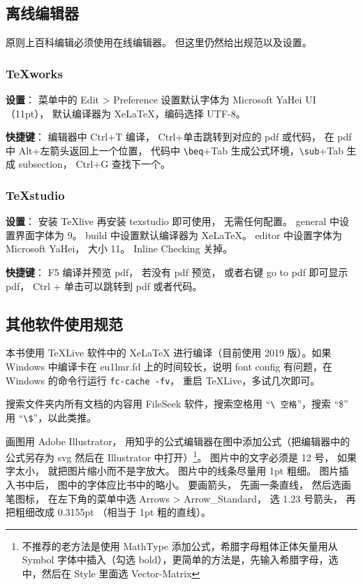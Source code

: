 
\subsection{离线编辑器}

原则上百科编辑必须使用在线编辑器。 但这里仍然给出规范以及设置。

\subsubsection{TeXworks}

\textbf{设置}： 菜单中的 Edit > Preference 设置默认字体为 Microsoft YaHei UI（11pt）， 默认编译器为 XeLaTeX，编码选择 UTF-8。

\textbf{快捷键}：
编辑器中 Ctrl+T 编译， 
Ctrl+单击跳转到对应的 pdf 或代码， 
在 pdf 中 Alt+左箭头返回上一个位置， 
代码中 \verb|\beq|+Tab 生成公式环境，\verb|\sub|+Tab 生成 subsection， Ctrl+G 查找下一个。

\subsubsection{TeXstudio}
\textbf{设置}： 安装 TeXlive 再安装 texstudio 即可使用， 无需任何配置。
general 中设置界面字体为 9。
build 中设置默认编译器为 XeLaTeX。
editor 中设置字体为 Microsoft YaHei， 大小 11。
Inline Checking 关掉。

\textbf{快捷键}：
F5 编译并预览 pdf， 若没有 pdf 预览， 或者右键 go to pdf 即可显示 pdf， Ctrl + 单击可以跳转到 pdf 或者代码。

\subsection{其他软件使用规范}
本书使用 TeXLive 软件中的 XeLaTeX 进行编译（目前使用 2019 版）。如果 Windows 中编译卡在 eu1lmr.fd 上的时间较长，说明 font config 有问题，在 Windows 的命令行运行 \verb|fc-cache -fv|， 重启 TeXLive，多试几次即可。

搜索文件夹内所有文档的内容用 FileSeek 软件，搜索空格用 “\verb|\ 空格|”，搜索 “\$” 用 “\verb|\$|”，以此类推。

画图用 Adobe Illustrator， 用知乎的公式编辑器在图中添加公式（把编辑器中的公式另存为 svg 然后在 Illustrator 中打开）\footnote{不推荐的老方法是使用 MathType 添加公式，希腊字母粗体正体矢量用从 Symbol 字体中插入（勾选 bold），更简单的方法是，先输入希腊字母，选中，然后在 Style 里面选 Vector-Matrix}。 图片中的文字必须是 12 号， 如果字太小， 就把图片缩小而不是字放大。 图片中的线条尽量用 1pt 粗细。 图片插入书中后， 图中的字体应比书中的略小。 要画箭头， 先画一条直线， 然后选画笔图标， 在左下角的菜单中选 Arrows > Arrow\_Standard， 选 1.23 号箭头， 再把粗细改成 0.3155pt （相当于 1pt 粗的直线）。

